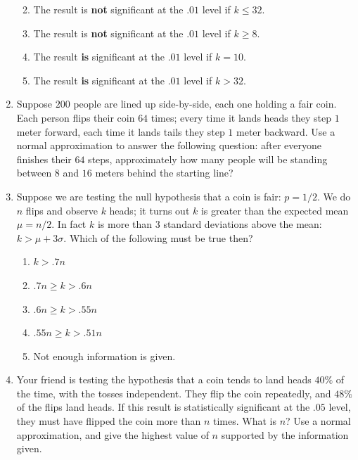 \documentclass[justified]{tufte-book}
\providecommand{\tightlist}{%
  \setlength{\itemsep}{0pt}\setlength{\parskip}{0pt}}
\theoremstyle{definition}
\theoremstyle{definition}
\theoremstyle{definition}
\theoremstyle{definition}
\theoremstyle{remark}
\begin{document}
\begin{enumerate}
  \begin{enumerate}
  \def\labelenumii{\alph{enumii}.}
  \tightlist
  \item
    The result is \textbf{not} significant at the \(.01\) level if \(k \leq 32\).
  \item
    The result is \textbf{not} significant at the \(.01\) level if \(k \geq 8\).
  \item
    The result \textbf{is} significant at the \(.01\) level if \(k = 10\).
  \item
    The result \textbf{is} significant at the \(.01\) level if \(k > 32\).
  \end{enumerate}
\item
  Suppose \(200\) people are lined up side-by-side, each one holding a fair coin. Each person flips their coin \(64\) times; every time it lands heads they step \(1\) meter forward, each time it lands tails they step \(1\) meter backward. Use a normal approximation to answer the following question: after everyone finishes their \(64\) steps, approximately how many people will be standing between \(8\) and \(16\) meters behind the starting line?
\item
  Suppose we are testing the null hypothesis that a coin is fair: \(p = 1/2\). We do \(n\) flips and observe \(k\) heads; it turns out \(k\) is greater than the expected mean \(\mu = n/2\). In fact \(k\) is more than \(3\) standard deviations above the mean: \(k > \mu + 3 \sigma\). Which of the following must be true then?

  \begin{enumerate}
  \def\labelenumii{\alph{enumii}.}
  \tightlist
  \item
    \(k > .7 n\)
  \item
    \(.7 n \geq k > .6 n\)
  \item
    \(.6 n \geq k > .55 n\)
  \item
    \(.55 n \geq k > .51 n\)
  \item
    Not enough information is given.
  \end{enumerate}
\item
  Your friend is testing the hypothesis that a coin tends to land heads \(40\%\) of the time, with the tosses independent. They flip the coin repeatedly, and \(48\%\) of the flips land heads. If this result is statistically significant at the \(.05\) level, they must have flipped the coin more than \(n\) times. What is \(n\)? Use a normal approximation, and give the highest value of \(n\) supported by the information given.
\end{enumerate}
\end{document}
